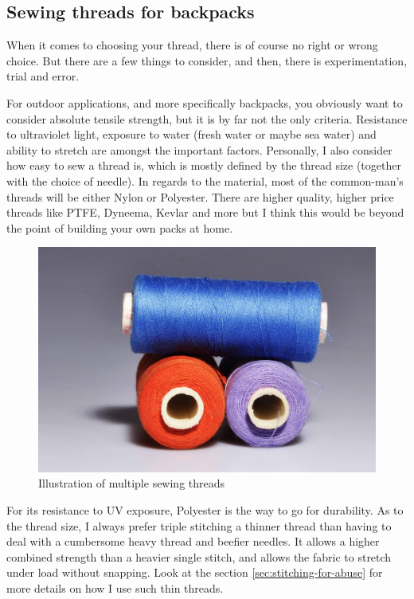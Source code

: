 \subsection{Sewing threads for backpacks} \label{sec:sewing-thread}

When it comes to choosing your thread, there is of course no right or wrong choice. But there are a few things to consider, and then, there is experimentation, trial and error.

For outdoor applications, and more specifically backpacks, you obviously want to consider absolute tensile strength, but it is by far not the only criteria. Resistance to ultraviolet light, exposure to water (fresh water or maybe sea water) and ability to stretch are amongst the important factors. Personally, I also consider how easy to sew a thread is, which is mostly defined by the thread size (together with the choice of needle). In regards to the material, most of the common-man's threads will be either Nylon or Polyester. There are higher quality, higher price threads like PTFE, Dyneema, Kevlar and more but I think this would be beyond the point of building your own packs at home.

\begin{figure}[H]
  \includegraphics[width=\textwidth]{media/images/place-holder}
  \caption{Illustration of multiple sewing threads}
  \label{img:sewing-threads}
\end{figure}

For its resistance to UV exposure, Polyester is the way to go for durability. As to the thread size, I always prefer triple stitching a thinner thread than having to deal with a cumbersome heavy thread and beefier needles. It allows a higher combined strength than a heavier single stitch, and allows the fabric to stretch under load without snapping. Look at the section \ref{sec:stitching-for-abuse} for more details on how I use such thin threads.

